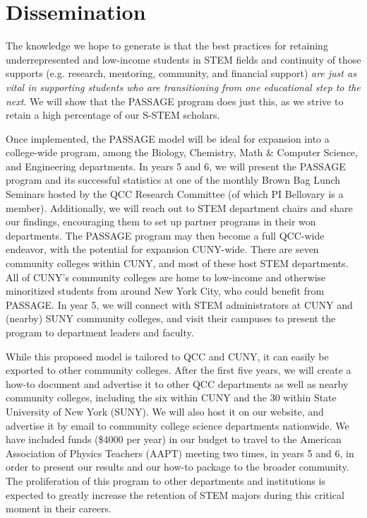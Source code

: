 \documentclass[12pt]{article}
\begin{document}
\section{\large{Dissemination}}
\vspace{-3mm}

The knowledge we hope to generate is that the best practices for retaining underrepresented and low-income students in STEM fields and continuity of those supports (e.g. research, mentoring, community, and financial support) {\em are just as vital in supporting students who are transitioning from one educational step to the next}.  We will show that the PASSAGE program does just this, as we strive to retain a high percentage of our S-STEM scholars.

Once implemented, the PASSAGE model will be ideal for expansion into a college-wide program, among the Biology, Chemistry, Math \& Computer Science, and Engineering departments.  In years 5 and 6, we will present the PASSAGE program and its successful statistics at one of the monthly Brown Bag Lunch Seminars hosted by the QCC Research Committee (of which PI Bellovary is a member).  Additionally, we will reach out to STEM department chairs and share our findings, encouraging them to set up partner programs in their won departments.   The PASSAGE program may then become a full QCC-wide endeavor, with the potential for expansion CUNY-wide.  There are seven community colleges within CUNY, and most of these host STEM departments.   All of CUNY's community colleges are home to low-income and otherwise minoritized students from around New York City, who could benefit from PASSAGE.  In year 5, we will connect with STEM administrators at CUNY and (nearby) SUNY community colleges, and visit their campuses to present the program to department leaders and faculty.

While this proposed model is tailored to QCC and CUNY, it can easily be exported to other community colleges.  After the first five years, we will create a how-to document and advertise it to other QCC departments as well as nearby community colleges, including the six within CUNY and the 30 within State University of New York (SUNY).  We will also host it on our website, and advertise it by email to community college science departments nationwide.  We have included funds (\$4000 per year) in our budget to travel to the American Association of Physics Teachers (AAPT) meeting two times, in years 5 and 6, in order to present our results and our how-to package to the broader community.  The proliferation of this program to other departments and institutions is expected to greatly increase the retention of STEM majors during this critical moment in their careers.   
\end{document}
